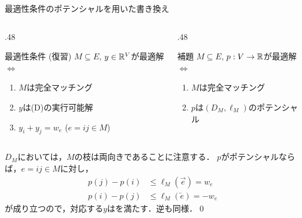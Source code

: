 \documentclass[14pt,aspectratio=169,xcolor=dvipsnames,table,onlytextwidth,dvipdfmx]{beamer}
\begin{document}
\begin{frame}{最適性条件のポテンシャルを用いた書き換え}
    \small
    \begin{columns}[T]
    \begin{column}{.48\textwidth}
        \begin{block}{最適性条件 (復習)}
        $M \subseteq E$, $y \in \mathbb{R}^V$が最適解 
        $\iff$
        \begin{enumerate}
            \setlength{\itemsep}{-0.3em}
            \item $M$は完全マッチング
            \item $y$は(D)の実行可能解
            \item $y_i + y_j = w_e$ \quad ($e = ij \in M$)
        \end{enumerate}
        \end{block}
    \end{column}
    \begin{column}{.48\textwidth}
        \begin{alertblock}{補題}
            $M\subseteq E$, $p: V \to \mathbb{R}$が最適解
            $\iff$
            \begin{enumerate}
                \setlength{\itemsep}{-0.3em}
                \item $M$は完全マッチング
                \item $p$は$(D_M, \ell_M)$のポテンシャル
            \end{enumerate}
        \end{alertblock}
    \end{column}
    \end{columns}

    \bigskip
    $D_M$においては，$M$の枝は両向きであることに注意する．
    $p$がポテンシャルならば，$e = ij \in M$に対し，
    \begin{align*}
        p(j) - p(i) & \leq \ell_M(\overrightarrow{e}) = w_e \\
        p(i) - p(j) & \leq \ell_M(\overleftarrow{e}) = -w_e 
    \end{align*}
    が成り立つので，対応する$y$はを満たす．逆も同様．\qed
\end{frame}
\end{document}
